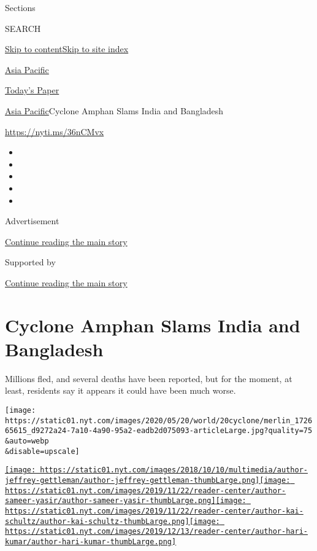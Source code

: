 Sections

SEARCH

\protect\hyperlink{site-content}{Skip to
content}\protect\hyperlink{site-index}{Skip to site index}

\href{https://www.nytimes.com/section/world/asia}{Asia Pacific}

\href{https://myaccount.nytimes.com/auth/login?response_type=cookie\&client_id=vi}{}

\href{https://www.nytimes.com/section/todayspaper}{Today's Paper}

\href{/section/world/asia}{Asia Pacific}\textbar{}Cyclone Amphan Slams
India and Bangladesh

\url{https://nyti.ms/36nCMvx}

\begin{itemize}
\item
\item
\item
\item
\item
\end{itemize}

Advertisement

\protect\hyperlink{after-top}{Continue reading the main story}

Supported by

\protect\hyperlink{after-sponsor}{Continue reading the main story}

\hypertarget{cyclone-amphan-slams-india-and-bangladesh}{%
\section{Cyclone Amphan Slams India and
Bangladesh}\label{cyclone-amphan-slams-india-and-bangladesh}}

Millions fled, and several deaths have been reported, but for the
moment, at least, residents say it appears it could have been much
worse.

\texttt{[image: https://static01.nyt.com/images/2020/05/20/world/20cyclone/merlin\_172665615\_d9272a24-7a10-4a90-95a2-eadb2d075093-articleLarge.jpg?quality=75\\\&auto=webp\\\&disable=upscale]}

\href{https://www.nytimes.com/by/jeffrey-gettleman}{\texttt{[image: https://static01.nyt.com/images/2018/10/10/multimedia/author-jeffrey-gettleman/author-jeffrey-gettleman-thumbLarge.png]}}\href{https://www.nytimes.com/by/sameer-yasir}{\texttt{[image: https://static01.nyt.com/images/2019/11/22/reader-center/author-sameer-yasir/author-sameer-yasir-thumbLarge.png]}}\href{https://www.nytimes.com/by/kai-schultz}{\texttt{[image: https://static01.nyt.com/images/2019/11/22/reader-center/author-kai-schultz/author-kai-schultz-thumbLarge.png]}}\href{https://www.nytimes.com/by/hari-kumar}{\texttt{[image: https://static01.nyt.com/images/2019/12/13/reader-center/author-hari-kumar/author-hari-kumar-thumbLarge.png]}}

